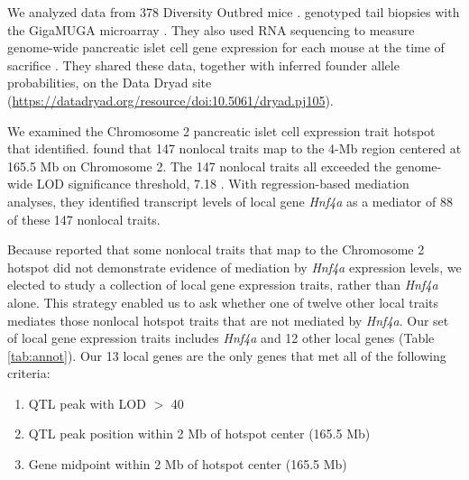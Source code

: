 \documentclass{book}
\newenvironment{frameenv}[1]
    {\begin{myfloat}[tb]
    \begin{mdframed}[roundcorner=10pt,backgroundcolor=blue!10]
    \caption{#1}
    }
    {%
    \end{mdframed}\end{myfloat}
    }
\begin{document}

We analyzed data from 378 Diversity Outbred mice \citep{keller2018genetic}. \citet{keller2018genetic} genotyped tail biopsies with the GigaMUGA microarray \citep{morgan2015mouse}. They also used RNA sequencing to measure genome-wide pancreatic islet cell gene expression for each mouse at the time of sacrifice \citep{keller2018genetic}. They shared these data, together with inferred founder allele probabilities, on the Data Dryad site (\url{https://datadryad.org/resource/doi:10.5061/dryad.pj105}).

We examined the Chromosome 2 pancreatic islet cell expression trait hotspot that \citet{keller2018genetic} identified. \citet{keller2018genetic} found that 147 nonlocal traits map to the 4-Mb region centered at 165.5 Mb on Chromosome 2. The 147 nonlocal traits all exceeded the genome-wide LOD significance threshold, 7.18 \citep{keller2018genetic}. With regression-based mediation analyses, they identified transcript levels of local gene \emph{Hnf4a} as a mediator of 88 of these 147 nonlocal traits.

Because \citet{keller2018genetic} reported that some nonlocal traits that map to the Chromosome 2 hotspot did not demonstrate evidence of mediation by \emph{Hnf4a} expression levels, we elected to study a collection of local gene expression traits, rather than \emph{Hnf4a} alone. This strategy enabled us to ask whether one of twelve other local traits mediates those nonlocal hotspot traits that are not mediated by \emph{Hnf4a}. Our set of local gene expression traits includes \emph{Hnf4a} and 12 other local genes (Table \ref{tab:annot}). Our 13 local genes are the only genes that met all of the following criteria:

\begin{frameenv}{Local gene inclusion criteria}\label{frame2}

\begin{enumerate}
    \item QTL peak with LOD $>$ 40
    \item QTL peak position within 2 Mb of hotspot center (165.5 Mb)
    \item Gene midpoint within 2 Mb of hotspot center (165.5 Mb)
\end{enumerate}
\end{frameenv}
\end{document}
